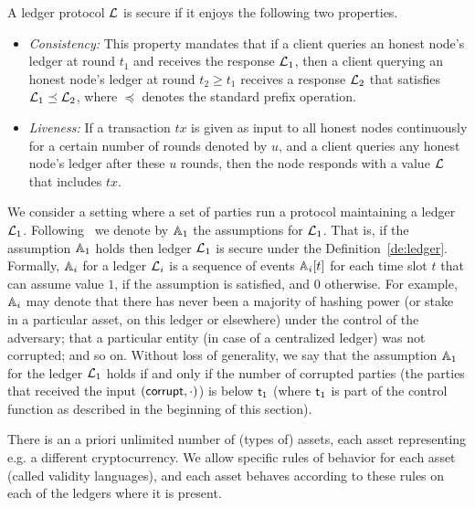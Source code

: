 \begin{definition}\label{de:ledger} A ledger protocol $\mathcal{L}$ is secure if it enjoys the following two properties.
\begin{itemize}

\item {\em Consistency:} This property mandates that if a client queries
an honest node's ledger at round $t_1$  
and receives the response $\mathcal{L}_1$, 
then a client querying an honest node's ledger at round $t_2\geq t_1 $
 receives a response $\mathcal{L}_2$ that satisfies $\mathcal{L}_1 \preceq \mathcal{L}_2$, 
where $\preceq$ denotes the standard prefix operation. 

\item {\em Liveness:} If a transaction $tx$ is given as input to all honest
nodes continuously for a certain number of rounds denoted by $u$, 
and a client queries any honest node's ledger
after these $u$ rounds, then the node responds with a value
$\mathcal{L}$ that includes $tx$.

\end{itemize}

\end{definition}


We consider a setting where a set of parties run a protocol maintaining a ledger $\mathcal{L}_1$. Following~\cite{sidechain} we denote by $\mathbb{A}_1$
the assumptions for $\mathcal{L}_1$.
 That is, if the assumption $\mathbb{A}_1$ holds then ledger $\mathcal{L}_1$ is secure under the Definition~\ref{de:ledger}.
Formally, $\mathbb{A}_i$ for a ledger $\mathcal{L}_i$ is a sequence of events $\mathbb{A}_i[t]$ for each time slot $t$ that can assume value $1$, 
if the assumption is satisfied, and $0$ otherwise.
For example, $\mathbb{A}_i$ may denote that
there has never been a majority of hashing power (or stake in a particular
asset, on this ledger or elsewhere) under the control of the adversary; that a
particular entity (in case of a centralized ledger) was not corrupted; and so
on.
Without loss of generality, we say that the assumption $\mathbb{A}_1$ for the ledger $\mathcal{L}_1$ holds if and only if the number of corrupted parties (the parties
that received the input $(\mathsf{corrupt}, \cdot)$) is below $\mathsf{t}_1$ (where $\mathsf{t}_1$ is part of the control function as described in the beginning 
of this section).


There is an a priori unlimited number of (types of) assets, each asset representing e.g. a different cryptocurrency. We allow specific rules of behavior for each asset (called validity languages), and each asset behaves according to these rules on each of the ledgers where it is present.


